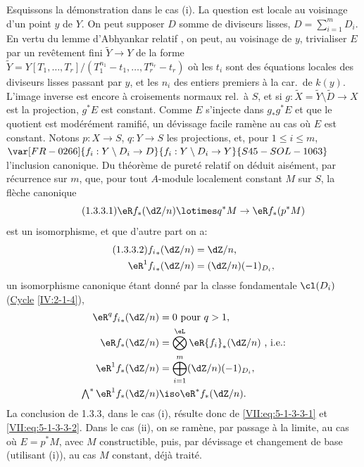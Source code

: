 Esquissons la démonstration dans le cas (i). La question est locale au 
voisinage d'un point $y$ de $Y$. On peut supposer $D$ somme de diviseurs 
lisses, $D=\sum_{i=1}^m D_i$. En vertu du lemme d'Abhyankar relatif 
, on peut, au voisinage de $y$, trivialiser $E$ par un 
revêtement fini $\widetilde Y\to Y$ de la forme 
$\widetilde Y=Y[T_1,\dots,T_r]/(T_1^{n_1}-t_1,\dots,T_r^{n_r}-t_r)$ où les 
$t_i$ sont des équations locales des diviseurs lisses passant par $y$, et les 
$n_i$ des entiers premiers à la car.\ de $k(y)$. L'image inverse 
 est encore à croisements normaux rel.\ à 
$S$, et si $g:\widetilde X=\widetilde Y\setminus \widetilde D\to X$ est la 
projection, $g^\ast E$ est constant. Comme $E$ s'injecte dans $g_\ast g^\ast E$ 
et que le quotient est modérément ramifié, un dévissage facile ramène 
au cas où $E$ est constant. Notons $p:X\to S$, $q:Y\to S$ les 
projections, et, pour $1\leqslant i\leqslant m$, $\var[FR-0266]{f_i:Y\setminus D_i \to D}{f_i:Y\setminus D_i \to Y}{S45-SOL-1063}$ 
l'inclusion canonique. Du théorème de pureté relatif  
on déduit aisément, par récurrence sur $m$, que, pour tout $A$-module 
localement constant $M$ sur $S$, la flèche canonique 
\begin{equation*}\tag{1.3.3.1}\label{VII:eq:5-1-3-3-1} %
  \eR f_\ast (\dZ/n)\lotimes q^\ast M\to \eR f_\ast (p^\ast M) 
\end{equation*}
est un isomorphisme, et que d'autre part on a: 
\begin{align*}\tag{1.3.3.2}\label{VII:eq:5-1-3-3-2}
  {f_i}_\ast(\dZ/n) &= \dZ/n \text{,} \\
  \eR^1 {f_i}_\ast (\dZ/n) &= (\dZ/n)(-1)_{D_i} \text{,} 
\end{align*}
un isomorphisme canonique étant donné par la classe fondamentale $\cl(D_i)$ 
(\hyperref[IV]{Cycle} \ref{IV:2-1-4}), 
\begin{align*}
  \eR^q {f_i}_\ast(\dZ/n) &= 0\text{ pour $q>1$,} \\
  \eR f_\ast (\dZ/n) &= \bigotimes^\eL \eR {f_i}_\ast (\dZ/n) \text{ , i.e.:} \\
  \eR^1 f_\ast(\dZ/n) &= \bigoplus_{i=1}^m (\dZ/n)(-1)_{D_i} \text{,} \\
  \textstyle\bigwedge^\ast \eR^1 f_\ast(\dZ/n) &\iso \eR^\ast f_\ast (\dZ/n) \text{.} 
\end{align*}
La conclusion de 1.3.3, dans le cas (i), résulte donc de 
\eqref{VII:eq:5-1-3-3-1} et \eqref{VII:eq:5-1-3-3-2}. Dans le cas (ii), on se 
ramène, par passage à la limite, au cas où $E=p^\ast M$, avec $M$ 
constructible, puis, par dévissage et changement de base (utilisant (i)), au 
cas $M$ constant, déjà traité. 

